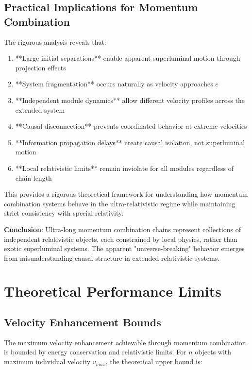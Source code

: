 \documentclass[11pt,a4paper]{article}
\theoremstyle{remark}
\begin{document}
\subsection{Practical Implications for Momentum Combination}

The rigorous analysis reveals that:

\begin{enumerate}
\item **Large initial separations** enable apparent superluminal motion through projection effects
\item **System fragmentation** occurs naturally as velocity approaches $c$ 
\item **Independent module dynamics** allow different velocity profiles across the extended system
\item **Causal disconnection** prevents coordinated behavior at extreme velocities
\item **Information propagation delays** create causal isolation, not superluminal motion
\item **Local relativistic limits** remain inviolate for all modules regardless of chain length
\end{enumerate}

This provides a rigorous theoretical framework for understanding how momentum combination systems behave in the ultra-relativistic regime while maintaining strict consistency with special relativity.

\textbf{Conclusion}: Ultra-long momentum combination chains represent collections of independent relativistic objects, each constrained by local physics, rather than exotic superluminal systems. The apparent "universe-breaking" behavior emerges from misunderstanding causal structure in extended relativistic systems.

\section{Theoretical Performance Limits}

\subsection{Velocity Enhancement Bounds}

The maximum velocity enhancement achievable through momentum combination is bounded by energy conservation and relativistic limits. For $n$ objects with maximum individual velocity $v_{max}$, the theoretical upper bound is:
\end{document}
